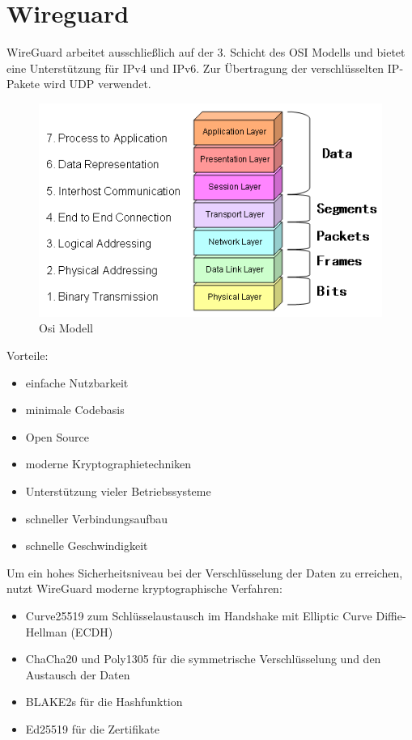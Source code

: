\section{Wireguard}
WireGuard arbeitet ausschließlich auf der 3. Schicht des OSI Modells und bietet eine Unterstützung für IPv4 und IPv6. Zur Übertragung der verschlüsselten IP-Pakete wird UDP verwendet.
\begin{figure}[H]
  \centering
  \includegraphics[scale=0.65]{images/osi.PNG}
  \caption{Osi Modell}
\end{figure}\noindent
Vorteile:
\begin{itemize}
    \item einfache Nutzbarkeit
    \item minimale Codebasis
    \item Open Source
    \item moderne Kryptographietechniken
    \item Unterstützung vieler Betriebssysteme
    \item schneller Verbindungsaufbau
    \item schnelle Geschwindigkeit \newline
    
\end{itemize}
Um ein hohes Sicherheitsniveau bei der Verschlüsselung der Daten zu erreichen, nutzt WireGuard moderne kryptographische Verfahren:
\begin{itemize}
    \item Curve25519 zum Schlüsselaustausch im Handshake mit Elliptic Curve Diffie-Hellman (ECDH)
    \item ChaCha20 und Poly1305 für die symmetrische Verschlüsselung und den Austausch der Daten
    \item BLAKE2s für die Hashfunktion
    \item Ed25519 für die Zertifikate
\end{itemize}
